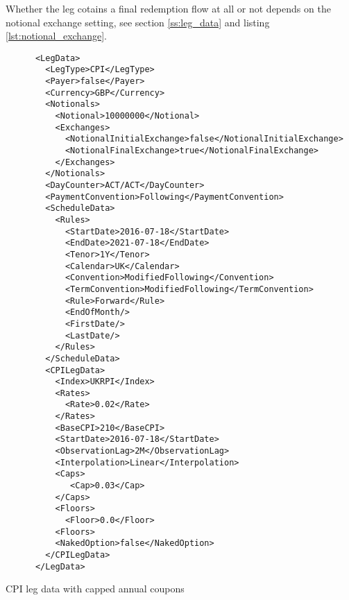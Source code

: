 Whether the leg cotains a final redemption flow at all or not depends on the
 notional exchange setting, see section \ref{ss:leg_data} and listing \ref{lst:notional_exchange}.

\begin{listing}[H]
\begin{verbatim}
      <LegData>
        <LegType>CPI</LegType>
        <Payer>false</Payer>
        <Currency>GBP</Currency>
        <Notionals>
          <Notional>10000000</Notional>
          <Exchanges>
            <NotionalInitialExchange>false</NotionalInitialExchange>
            <NotionalFinalExchange>true</NotionalFinalExchange>
          </Exchanges>          
        </Notionals>
        <DayCounter>ACT/ACT</DayCounter>
        <PaymentConvention>Following</PaymentConvention>
        <ScheduleData>
          <Rules>
            <StartDate>2016-07-18</StartDate>
            <EndDate>2021-07-18</EndDate>
            <Tenor>1Y</Tenor>
            <Calendar>UK</Calendar>
            <Convention>ModifiedFollowing</Convention>
            <TermConvention>ModifiedFollowing</TermConvention>
            <Rule>Forward</Rule>
            <EndOfMonth/>
            <FirstDate/>
            <LastDate/>
          </Rules>
        </ScheduleData>
        <CPILegData>
          <Index>UKRPI</Index>
          <Rates>
            <Rate>0.02</Rate>
          </Rates>
          <BaseCPI>210</BaseCPI>
          <StartDate>2016-07-18</StartDate>
          <ObservationLag>2M</ObservationLag>
          <Interpolation>Linear</Interpolation>
          <Caps>
             <Cap>0.03</Cap>
          </Caps>
          <Floors>
            <Floor>0.0</Floor>
          <Floors>
          <NakedOption>false</NakedOption>          
        </CPILegData>
      </LegData>
\end{verbatim}
\caption{CPI leg data with capped annual coupons}
\label{lst:cpilegdata}
\end{listing}

